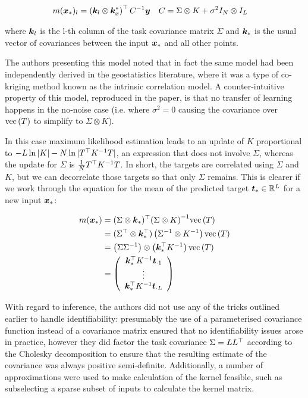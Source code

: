 \begin{align}
m(\bm x_*)_l & = \left(\bm k_l \otimes \bm k_x^* \right)^\top{C}^{-1} \bm y & C & = \Sigma \otimes K + \sigma^2 I_N \otimes I_L
\end{align}

where $\bm k_l$ is the l-th column of the task covariance matrix $\Sigma$ and $\bm k_*$ is the usual vector of covariances between the input $\bm x_*$ and all other points.

The authors presenting this model noted that in fact the same model had been independently derived in the geostatistics literature, where it was a type of co-kriging method known as the intrinsic correlation model\cite{Wackernagel1998}. A counter-intuitive property of this model, reproduced in the paper, is that no transfer of learning happens in the no-noise case (i.e. where $\sigma^2 = 0$ causing the covariance over $\text{vec}\left(T\right)$ to simplify to $\Sigma \otimes K$). 

In this case maximum likelihood estimation leads to an update of $K$ proportional to $-L \ln |K| - N \ln |T^\top {K}^{-1} T|$, an expression that does not involve $\Sigma$, whereas the update for $\Sigma$ is $\frac{1}{N}T^\top {K}^{-1} T$. In short, the targets are correlated using $\Sigma$ and $K$, but we can decorrelate those targets so that only $\Sigma$ remains. This is clearer if we work through the equation for the mean of the predicted target $\bm t_* \in { \mathbb{R}^{L} }$ for a new input $\bm x_*$:

\begin{align}
m(\bm x_*) & = (\Sigma \otimes \bm k_*)^\top{\left( \Sigma \otimes K \right)}^{-1}\text{vec}\left(T\right) \\
& = (\Sigma^\top \otimes \bm k_*^\top)\left({\Sigma}^{-1} \otimes {K}^{-1}\right)\text{vec}\left(T\right)\\
& = \left(\Sigma {\Sigma}^{-1} \right) \otimes \left(\bm k_*^\top {K}^{-1}\right)\text{vec}\left(T\right) \\
& = \left( \begin{array}{c}
     \bm k_*^\top {K}^{-1} \bm t_{\cdot 1} \\
     \vdots \\
     \bm k_*^\top {K}^{-1} \bm t_{\cdot L} \\
 \end{array}\right) \\
\end{align}

With regard to inference, the authors did not use any of the tricks outlined earlier to handle identifiability: presumably the use of a parameterised covariance function instead of a covariance matrix ensured that no identifiability issues arose in practice, however they did factor the task covariance $\Sigma = L L^\top$ according to the Cholesky decomposition to ensure that the resulting estimate of the covariance was always positive semi-definite. Additionally, a number of approximations were used to make calculation of the kernel feasible, such as subselecting a sparse subset of inputs to calculate the kernel matrix.

